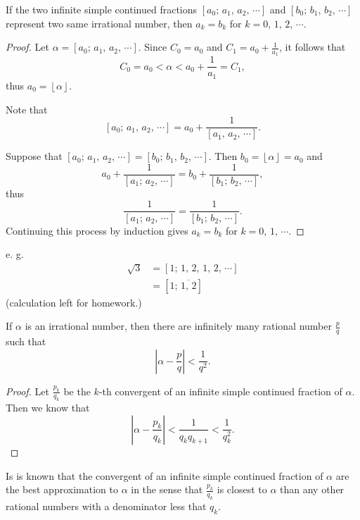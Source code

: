 \begin{theorem}
    If the two infinite simple continued fractions
    $\left[a_0;\,a_1,\,a_2,\,\cdots\right]$ and $\left[b_0;\,b_1,\,b_2,\,\cdots\right]$
    represent two same irrational number, then $a_k = b_k$ for $k=0,\,1,\,2,\,\cdots$.
\end{theorem}

\begin{proof}
    Let $\alpha = \left[a_0;\,a_1,\,a_2,\,\cdots\right]$.
    Since $C_0=a_0$ and $C_1=a_0+\frac{1}{a_1}$, it follows that
    \[
        C_0=a_0<\alpha<a_0+\frac{1}{a_1}=C_1,
    \]
    thus $a_0 = \left\lfloor \alpha \right\rfloor$.

    Note that
    \[
        \left[ a_0;\,a_1,\,a_2,\,\cdots \right] = a_0+\frac{1}{\left[ a_1,\,a_2,\,\cdots \right]}.
    \]

    Suppose that $\left[ a_0;\,a_1,\,a_2,\,\cdots \right] = \left[ b_0;\,b_1,\,b_2,\,\cdots \right]$.
    Then $b_0=\left\lfloor \alpha\right\rfloor=a_0$ and
    \[
        a_0+\frac{1}{\left[ a_1;\,a_2,\,\cdots \right]} = b_0+\frac{1}{\left[ b_1;\,b_2,\,\cdots \right]},
    \]
    thus
    \[
        \frac{1}{\left[ a_1;\,a_2,\,\cdots \right]} = \frac{1}{\left[ b_1;\,b_2,\,\cdots \right]}.
    \]
    Continuing this process by induction gives $a_k=b_k$ for $k=0,\,1,\,\cdots$.
\end{proof}

e. g.
\begin{align*}
    \sqrt{3} &= \left[ 1;\,1,\,2,\,1,\,2,\,\cdots \right] \\
    &= \left[ 1;\,\overline{1,\,2} \right]
\end{align*}
(calculation left for homework.)

\begin{theorem}
    If $\alpha$ is an irrational number, then there are infinitely many
    rational number $\frac{p}{q}$ such that
    \[
        \left|\alpha-\frac{p}{q}\right|<\frac{1}{q^2}.
    \]
\end{theorem}

\begin{proof}
    Let $\frac{p_k}{q_k}$ be the $k$-th convergent of an infinite simple
    continued fraction of $\alpha$. Then we know that
    \[
        \left|\alpha-\frac{p_k}{q_k}\right| < \frac{1}{q_kq_{k+1}} < \frac{1}{q_k^2}.
    \]
\end{proof}

\begin{remark}
    Is is known that the convergent of an infinite simple continued fraction
    of $\alpha$ are the best approximation to $\alpha$ in the sense that
    $\frac{p_k}{q_k}$ is closest to $\alpha$ than any other rational numbers with a
    denominator less that $q_k$.
\end{remark}

